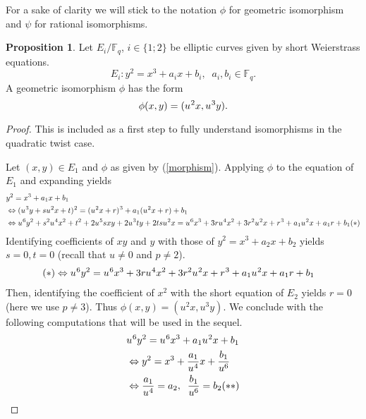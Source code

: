 \documentclass[10pt]{article}
\theoremstyle{definition}
\newtheorem{proposition}{Proposition}
\newcommand{\F}{\mathbb{F}}
\begin{document}
For a sake of clarity we will stick to the notation $\phi$ for geometric isomorphism and $\psi$ for rational isomorphisms.

\begin{proposition}\label{prop:auto}
Let $E_i/\F_q$, $i \in \lbrace 1; 2 \rbrace$ be elliptic curves given by short Weierstrass equations.
\[ E_i : y^2 = x^3 + a_ix + b_i, \; \; a_i,b_i \in \F_q. \]
A geometric isomorphism $\phi$ has the form 
\[ \phi(x,y) = (u^{\mkern1mu 2}x, u^{\mkern1mu 3}y).\]  
\end{proposition}
\begin{proof}
This is included as a first step to fully understand isomorphisms in the quadratic twist case.

\noindent Let $(x,y) \in E_1$ and $\phi$ as given by (\ref{morphism}).
Applying $\phi$ to the equation of $E_1$ and expanding yields 
\begin{align*}
&y^2 = x^3 + a_1x + b_1\\
 & \Leftrightarrow ( u^{\mkern1mu 3}y + su^{\mkern1mu 2}x + t)^{\mkern1mu 2} =  (u^{\mkern1mu 2}x +r)^{\mkern1mu 3} +a_1(u^{\mkern1mu 2}x +r) +b_1 \\
& \Leftrightarrow  u^{\mkern1mu 6}y^2 + s^2u^{\mkern1mu 4}x^2 + t^2 + 2u^{\mkern1mu 5}sxy + 2u^{\mkern1mu 3}ty + 2tsu^{\mkern1mu 2}x  
=  u^{\mkern1mu 6}x^3 + 3ru^{\mkern1mu 4}x^2 + 3r^2 u^{\mkern1mu 2}x +r^{\mkern1mu 3} +a_1u^{\mkern1mu 2}x +a_1r +b_1 (*)\\
\end{align*} 
Identifying coefficients of $xy$ and $y$ with those of $y^2 = x^3 + a_2x + b_2$ yields $s=0, t= 0$ (recall that $u \neq 0$ and $ p \neq 2$).
\begin{align*}
(*) & \Leftrightarrow  u^{\mkern1mu 6}y^2   
=  u^{\mkern1mu 6}x^3 + 3ru^{\mkern1mu 4}x^2 + 3r^2 u^{\mkern1mu 2}x +r^{\mkern1mu 3} +a_1u^{\mkern1mu 2}x +a_1r +b_1 
\end{align*}
Then, identifying the coefficient of $x^2$ with the short equation of $E_2$ yields $r=0$ (here we use $p \neq 3$).
Thus $\phi(x,y) = (u^2x,u^3y)$.
We conclude with the following computations that will be used in the sequel.
\begin{align*}
 &u^{\mkern1mu 6}y^2   
=  u^{\mkern1mu 6}x^3 +a_1u^{\mkern1mu 2}x  +b_1 \\
& \Leftrightarrow  y^2   
=  x^3 +\frac{a_1}{u^{\mkern1mu 4}}x  + \frac{b_1}{u^6} \\
& \Leftrightarrow
\frac{a_1}{u^{\mkern1mu 4}} = a_2 , \; \;  \frac{b_1}{u^6}=b_2 (**)
\end{align*}
\end{proof}
\end{document}
